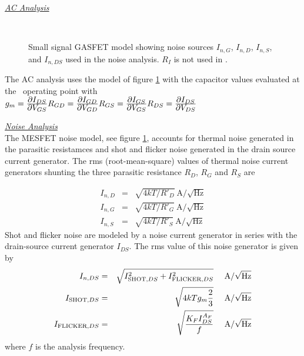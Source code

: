 \noindent\underline{\sl \large AC Analysis}
\begin{figure}[h]
\centering
\ \epsfxsize=2.75in
\caption[Small signal GASFET model]{Small signal GASFET model
showing noise sources $I_{n,G}$, $I_{n,D}$, $I_{n,S}$, and
$I_{n,DS}$ used in the noise analysis.
$R_I$ is not used in \pspice .
\label{fig:gaasAC} }
\end{figure}
The AC analysis uses the model of figure \ref{fig:gaasAC} with the capacitor
values evaluated at the \dc\ operating point with\\
\hspace*{\fill}
$g_m={{\textstyle\partial I_{DS}} \over {\textstyle\partial V_{GS}}}
\hfill
R_{GD}={{\textstyle\partial I_{GD}} \over {\textstyle\partial V_{GD}}}
\hfill
R_{GS}={{\textstyle\partial I_{GS}} \over {\textstyle\partial V_{GS}}}
\hfill
R_{DS}={{\textstyle\partial I_{DS}} \over {\textstyle\partial V_{DS}}}$
\inlineeq

\noindent\underline{\sl \large Noise Analysis}\\[0.1in]
The MESFET noise model, see figure \ref{fig:gaasAC}, accounts for thermal
noise generated in the
parasitic resistamces and shot and flicker noise generated in the
drain source current generator.  The rms (root-mean-square) values of
thermal noise current generators shunting the three parasitic resistance
$R_D$, $R_G$ and $R_S$ are

\begin{eqnarray}
I_{n,D} &=& \sqrt{4kT/R'_D}~\mbox{A/}\sqrt{\mbox{Hz}}\\
I_{n,G} &=& \sqrt{4kT/R'_G}~\mbox{A/}\sqrt{\mbox{Hz}}\\
I_{n,S} &=& \sqrt{4kT/R'_S}~\mbox{A/}\sqrt{\mbox{Hz}}
\end{eqnarray}
Shot and flicker noise are modeled by
a noise current generator in series with the drain-source current generator
$I_{DS}$.
The rms value of this noise generator is given by
\begin{eqnarray}
I_{n,DS} &=& \sqrt{I_{\mbox{\scriptsize SHOT},DS}^2 + I_{\mbox{\scriptsize FLICKER},DS}^2}
~~~~\mbox{A/}\sqrt{\mbox{Hz}}\\
I_{\mbox{\scriptsize SHOT},DS} &=& \sqrt{4kTg_m\frac{2}{3}}
~~~~\mbox{A/}\sqrt{\mbox{Hz}}\\
I_{\mbox{\scriptsize FLICKER},DS} &=& \sqrt{{{\textstyle K_F I_{DS}^{A_F}}
                         \over {\textstyle f }}}
~~~~\mbox{A/}\sqrt{\mbox{Hz}}
\end{eqnarray}
where $f$ is the analysis frequency.
